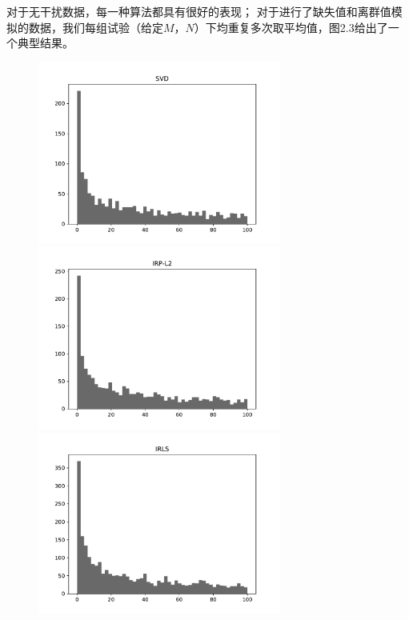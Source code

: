 对于无干扰数据，每一种算法都具有很好的表现；
对于进行了缺失值和离群值模拟的数据，我们每组试验（给定$M$，$ N$）下均重复多次取平均值，图2.3给出了一个典型结果。
\begin{figure}[H]
    \centering
    \begin{minipage}[t]{0.48\textwidth}
    \includegraphics[width=8cm]{pics/lab1/svd.pdf}
    \end{minipage}
    \begin{minipage}[t]{0.48\textwidth}
    \includegraphics[width=8cm]{pics/lab1/IRP-L2.pdf}
    \end{minipage}
    \begin{minipage}[t]{0.48\textwidth}
    \includegraphics[width=8cm]{pics/lab1/IRLS.pdf}
    \end{minipage}
    \begin{minipage}[t]{0.48\textwidth}

\end{minipage}
\end{figure}
